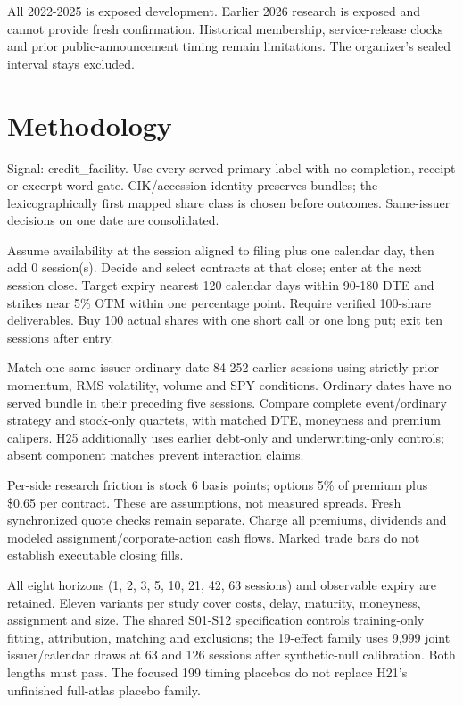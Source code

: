 \documentclass[11pt,letterpaper]{article}
\begin{document}
All 2022-2025 is exposed development. Earlier 2026 research is exposed and cannot provide fresh confirmation. Historical membership, service-release clocks and prior public-announcement timing remain limitations. The organizer's sealed interval stays excluded.


\clearpage
\section{Methodology}
Signal: credit\_facility. Use every served primary label with no completion, receipt or excerpt-word gate. CIK/accession identity preserves bundles; the lexicographically first mapped share class is chosen before outcomes. Same-issuer decisions on one date are consolidated.

Assume availability at the session aligned to filing plus one calendar day, then add 0 session(s). Decide and select contracts at that close; enter at the next session close. Target expiry nearest 120 calendar days within 90-180 DTE and strikes near 5\% OTM within one percentage point. Require verified 100-share deliverables. Buy 100 actual shares with one short call or one long put; exit ten sessions after entry.

Match one same-issuer ordinary date 84-252 earlier sessions using strictly prior momentum, RMS volatility, volume and SPY conditions. Ordinary dates have no served bundle in their preceding five sessions. Compare complete event/ordinary strategy and stock-only quartets, with matched DTE, moneyness and premium calipers. H25 additionally uses earlier debt-only and underwriting-only controls; absent component matches prevent interaction claims.

Per-side research friction is stock 6 basis points; options 5\% of premium plus \$0.65 per contract. These are assumptions, not measured spreads. Fresh synchronized quote checks remain separate. Charge all premiums, dividends and modeled assignment/corporate-action cash flows. Marked trade bars do not establish executable closing fills.

All eight horizons (1, 2, 3, 5, 10, 21, 42, 63 sessions) and observable expiry are retained. Eleven variants per study cover costs, delay, maturity, moneyness, assignment and size. The shared S01-S12 specification controls training-only fitting, attribution, matching and exclusions; the 19-effect family uses 9,999 joint issuer/calendar draws at 63 and 126 sessions after synthetic-null calibration. Both lengths must pass. The focused 199 timing placebos do not replace H21's unfinished full-atlas placebo family.
\end{document}

